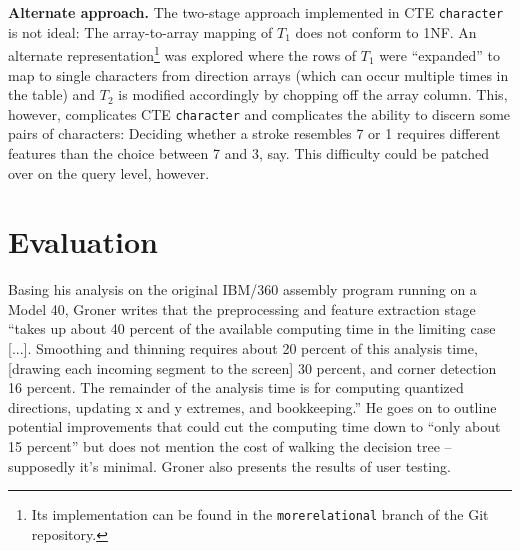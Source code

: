 \documentclass[sigconf]{acmart}
\begin{document}
\textbf{Alternate approach.} The two-stage approach implemented in CTE \texttt{character} is not ideal: The array-to-array mapping of $T_1$ does not conform to 1NF. An alternate representation\footnote{Its implementation can be found in the \texttt{morerelational} branch of the Git repository.} was explored where the rows of $T_1$ were \enquote{expanded} to map to single characters from direction arrays (which can occur multiple times in the table) and $T_2$ is modified accordingly by chopping off the array column. This, however, complicates CTE \texttt{character} and complicates the ability to discern some pairs of characters: Deciding whether a stroke resembles 7 or 1 requires different features than the choice between 7 and 3, say. This difficulty could be patched over on the query level, however.


\section{Evaluation}

Basing his analysis on the original IBM/360 assembly program running on a Model 40, Groner writes that the preprocessing and feature extraction stage \enquote{takes up about 40 percent of the available computing time in the limiting case [...]. Smoothing and thinning requires about 20 percent of this analysis time, [drawing each incoming segment to the screen] 30 percent, and corner detection 16 percent. The remainder of the analysis time is for computing quantized directions, updating x and y extremes, and bookkeeping.} He goes on to outline potential improvements that could cut the computing time down to \enquote{only about 15 percent} \cite{groner} but does not mention the cost of walking the decision tree – supposedly it's minimal. Groner also presents the results of user testing.
\end{document}
